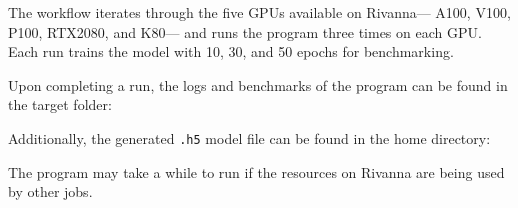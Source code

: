The workflow iterates through the five GPUs available on Rivanna---
A100, V100, P100, RTX2080, and K80--- and runs the program three times
on each GPU. Each run trains the model with 10, 30, and 50 epochs for
benchmarking.

Upon completing a run, the logs and benchmarks of the program can be
found in the target folder:

\begin{Shaded}
\begin{Highlighting}[]
\end{Highlighting}
\end{Shaded}

Additionally, the generated \texttt{.h5} model file can be found in the
home directory:

\begin{Shaded}
\begin{Highlighting}[]
\end{Highlighting}
\end{Shaded}

The program may take a while to run if the resources on Rivanna are
being used by other jobs.
